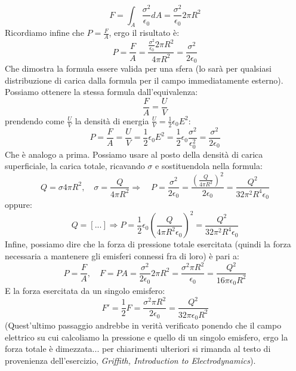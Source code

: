 \documentclass[a4paper,12pt]{article}
\begin{document}
\begin{itemize}
    $$ F = \int_A \frac{\sigma^2}{\epsilon_0} dA = \frac{\sigma^2}{\epsilon_0} 2\pi R^2 $$
    Ricordiamo infine che $P = \frac{F}{A}$, ergo il risultato è:
    $$ P = \frac{F}{A} = \frac{\frac{\sigma^2}{\epsilon_0} 2\pi R^2}{4\pi R^2} = \frac{\sigma^2}{2\epsilon_0} $$
    Che dimostra la formula essere valida per una sfera (lo sarà per qualsiasi distribuzione di carica dalla formula per il campo immediatamente esterno).\\
    Possiamo ottenere la stessa formula dall'equivalenza:
    $$ \frac{F}{A} = \frac{U}{V} $$
    prendendo come $\frac{U}{V}$ la densità di energia $ \frac{U}{V} = \frac{1}{2} \epsilon_0 E^2$:
    $$ P = \frac{F}{A} = \frac{U}{V} = \frac{1}{2} \epsilon_0 E^2 = \frac{1}{2} \epsilon_0 \frac{\sigma^2}{\epsilon_0^2} = \frac{\sigma^2}{2\epsilon_0}$$
    Che è analogo a prima. Possiamo usare al posto della densità di carica superficiale, la carica totale, ricavando $\sigma$ e sostituendola nella formula:
    $$ Q = \sigma 4\pi R^2, \quad \sigma = \frac{Q}{4\pi R^2} \Rightarrow \quad P = \frac{\sigma^2}{2\epsilon_0} = \frac{\left(\frac{Q}{4\pi R^2}\right)^2}{2\epsilon_0} = \frac{Q^2}{32\pi^2R^4\epsilon_0}$$
    oppure:
    $$ Q = [...] \Rightarrow P = \frac{1}{2} \epsilon_0 \left(\frac{Q}{4\pi R^2 \epsilon_0}\right)^2 = \frac{Q^2}{32\pi^2R^4\epsilon_0}$$
    Infine, possiamo dire che la forza di pressione totale esercitata (quindi la forza necessaria a mantenere gli emisferi connessi fra di loro) è pari a:
    $$ P = \frac{F}{A}, \quad F = PA = \frac{\sigma^2}{2\epsilon_0} 2\pi R^2 = \frac{\sigma^2 \pi R^2}{\epsilon_0} = \frac{Q^2}{16\pi\epsilon_0 R^2} $$
    E la forza esercitata da un singolo emisfero:
    $$ F' = \frac{1}{2}F = \frac{\sigma^2 \pi R^2}{2\epsilon_0} = \frac{Q^2}{32\pi \epsilon_0 R^2} $$
    (Quest'ultimo passaggio andrebbe in verità verificato ponendo che il campo elettrico su cui calcoliamo la pressione e quello di un singolo emisfero, ergo la forza totale è dimezzata... per chiarimenti ulteriori
    si rimanda al testo di provenienza dell'esercizio, \textit{Griffith, Introduction to Electrodynamics}).
\end{itemize}
\end{document}
